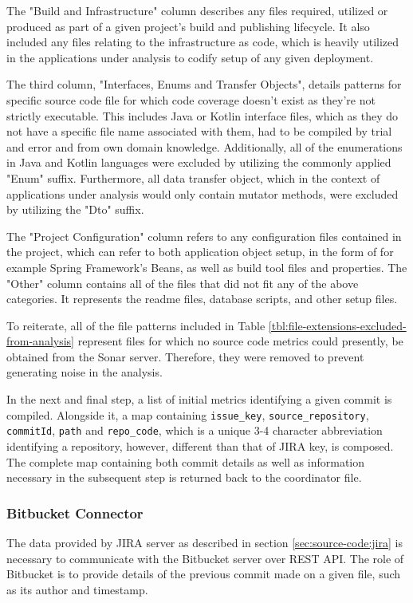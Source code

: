 The "Build and Infrastructure" column describes any files required, utilized or produced as part of a given project's build and publishing lifecycle. It also included any files relating to the infrastructure as code, which is heavily utilized in the applications under analysis to codify setup of any given deployment.

The third column, "Interfaces, Enums and Transfer Objects", details patterns for specific source code file for which code coverage doesn't exist as they're not strictly executable. This includes Java or Kotlin interface files, which as they do not have a specific file name associated with them, had to be compiled by trial and error and from own domain knowledge. Additionally, all of the enumerations in Java and Kotlin languages were excluded by utilizing the commonly applied "Enum" suffix. Furthermore, all data transfer object, which in the context of applications under analysis would only contain mutator methods, were excluded by utilizing the "Dto" suffix. 

The "Project Configuration" column refers to any configuration files contained in the project, which can refer to both application object setup, in the form of for example Spring Framework's Beans, as well as build tool files and properties. 
The "Other" column contains all of the files that did not fit any of the above categories. It represents the readme files, database scripts, and other setup files.

To reiterate, all of the file patterns included in Table \ref{tbl:file-extensions-excluded-from-analysis} represent files for which no source code metrics could presently, be obtained from the Sonar server. Therefore, they were removed to prevent generating noise in the analysis.
    
In the next and final step, a list of initial metrics identifying a given commit is compiled. Alongside it, a map containing \texttt{issue\_key}, \texttt{source\_repository}, \texttt{commitId}, \texttt{path} and \texttt{repo\_code}, which is a unique 3-4 character abbreviation identifying a repository, however, different than that of JIRA key, is composed. The complete map containing both commit details as well as information necessary in the subsequent step is returned back to the coordinator file. 

\subsubsection{Bitbucket Connector}\label{sec:source-code:bitbucket}
The data provided by JIRA server as described in section \ref{sec:source-code:jira} is necessary to communicate with the Bitbucket server over REST API. The role of Bitbucket is to provide details of the previous commit made on a given file, such as its author and timestamp. 

